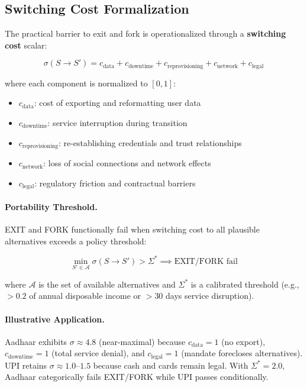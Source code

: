 \documentclass{article}
\begin{document}
\subsection{Switching Cost Formalization}

The practical barrier to exit and fork is operationalized through a \textbf{switching cost} scalar:

\begin{equation}
\sigma(S \to S') = c_{\text{data}} + c_{\text{downtime}} + c_{\text{reprovisioning}} + c_{\text{network}} + c_{\text{legal}}
\label{eq:switching-cost}
\end{equation}

where each component is normalized to $[0,1]$:
\begin{itemize}[noitemsep]
    \item $c_{\text{data}}$: cost of exporting and reformatting user data
    \item $c_{\text{downtime}}$: service interruption during transition
    \item $c_{\text{reprovisioning}}$: re-establishing credentials and trust relationships
    \item $c_{\text{network}}$: loss of social connections and network effects
    \item $c_{\text{legal}}$: regulatory friction and contractual barriers
\end{itemize}

\paragraph{Portability Threshold.} EXIT and FORK functionally fail when switching cost to all plausible alternatives exceeds a policy threshold:

\begin{equation}
\min_{S' \in \mathcal{A}} \sigma(S \to S') > \Sigma^* \implies \text{EXIT/FORK fail}
\label{eq:portability-threshold}
\end{equation}

where $\mathcal{A}$ is the set of available alternatives and $\Sigma^*$ is a calibrated threshold (e.g., $>0.2$ of annual disposable income or $>30$ days service disruption).

\paragraph{Illustrative Application.} Aadhaar exhibits $\sigma \approx 4.8$ (near-maximal) because $c_{\text{data}} = 1$ (no export), $c_{\text{downtime}} = 1$ (total service denial), and $c_{\text{legal}} = 1$ (mandate forecloses alternatives). UPI retains $\sigma \approx 1.0$--$1.5$ because cash and cards remain legal. With $\Sigma^* = 2.0$, Aadhaar categorically fails EXIT/FORK while UPI passes conditionally.
\end{document}
